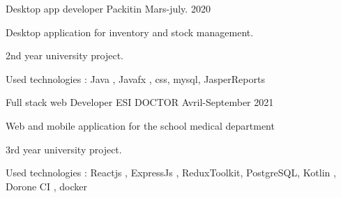 

\begin{cventries}

  \cventry
    {Desktop app developer} %
    {Packitin } %
    {} %
    {Mars-july. 2020} %
    {
      \begin{cvitems} %
        \item {Desktop application for inventory and stock management.}
        \item {2nd year university project.}
        \item {Used technologies : Java , Javafx , css, mysql, JasperReports }
      \end{cvitems}
    }

  \cventry
    {Full stack web Developer} %
    {ESI DOCTOR} %
    {} %
    {Avril-September 2021} %
    {
      \begin{cvitems} %
        \item {Web and mobile application for the school medical department }    \item {3rd year university project.}
        \item {Used technologies : Reactjs , ExpressJs , ReduxToolkit, PostgreSQL, Kotlin , Dorone CI , docker }
      \end{cvitems}
    }

\end{cventries}
